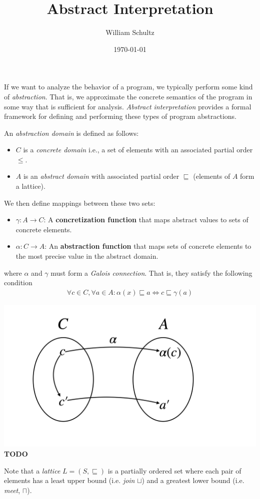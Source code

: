 \documentclass[10pt]{article}
\begin{document}
\title{Abstract Interpretation}
\author{William Schultz}
\date{\today}

\maketitle


If we want to analyze the behavior of a program, we typically perform some kind of \textit{abstraction}. That is, we approximate the concrete semantics of the program in some way that is sufficient for analysis. \textit{Abstract interpretation} provides a formal framework for defining and performing these types of program abstractions.

An \textit{abstraction domain} is defined as follows: 
\begin{itemize}
    \item $C$ is a \textit{concrete domain} i.e., a set of elements with an associated partial order $\leq$.
    \item $A$ is an \textit{abstract domain} with associated partial order $\sqsubseteq$ (elements of $A$ form a lattice).
\end{itemize}
We then define mappings between these two sets:
\begin{itemize}
    \item $\gamma : A \rightarrow C$: A \textbf{concretization function} that maps abstract values to sets of concrete elements.
    \item $\alpha : C \rightarrow A$: An \textbf{abstraction function} that maps sets of concrete elements to the most precise value in the abstract domain. 
\end{itemize}
where $\alpha$ and $\gamma$ must form a \textit{Galois connection}. That is, they satisfy the following condition
\begin{align*}
    \forall c \in C, \forall a \in A : \alpha(x) \sqsubseteq a \Leftrightarrow c \sqsubseteq \gamma(a) 
\end{align*} 
\begin{center}
    \includegraphics[scale=0.15]{diagrams/diagrams.001.png}
    \textbf{TODO}
\end{center}
Note that a \textit{lattice} $L=(S,\sqsubseteq)$ is a partially ordered set where each pair of elements has a least upper bound (i.e. \textit{join} $\sqcup$) and a greatest lower bound (i.e. \textit{meet}, $\sqcap$).
\end{document}

